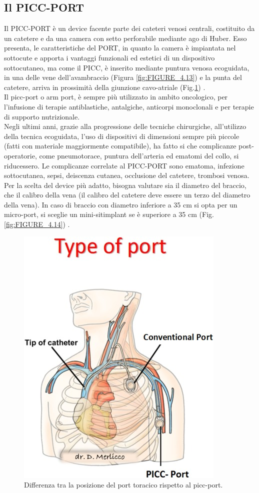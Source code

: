 \subsection{Il PICC-PORT}

Il PICC-PORT è un device facente parte dei cateteri venosi centrali, costituito da un catetere e da una camera con 
setto perforabile mediante ago di Huber. Esso presenta, le caratteristiche del PORT, in quanto la 
camera è impiantata nel sottocute e apporta i vantaggi funzionali ed estetici di un dispositivo sottocutaneo, 
ma come il PICC, è inserito mediante puntura venosa ecoguidata, in una delle vene dell'avambraccio \cite{MERLICCO}
(Figura \ref{fig:FIGURE_4.13})
e la punta del catetere, arriva in prossimità della giunzione cavo-atriale (Fig.\ref{fig:FIGURE_4.12}) \cite{CRO}.\\
Il picc-port o arm port, è sempre più utilizzato in ambito oncologico, per l'infusione di terapie antiblastiche, 
antalgiche, anticorpi monoclonali e per terapie di supporto nutrizionale\cite{GAVECELTPICCPORT}.\\
Negli ultimi anni, grazie alla progressione delle tecniche chirurgiche, all'utilizzo della tecnica ecoguidata, 
l'uso di dispositivi di dimensioni sempre più piccole (fatti con materiale maggiormente compatibile), ha fatto si che 
complicanze post-operatorie, come pneumotorace, puntura dell'arteria ed
ematomi del collo, si riducessero.
Le complicanze correlate al PICC-PORT sono ematoma, infezione sottocutanea, sepsi, deiscenza cutanea, occlusione del 
catetere, trombosi venosa.\\ 
Per la scelta del device più adatto, bisogna valutare sia il diametro del braccio, che il calibro della vena 
(il calibro del catetere deve essere un terzo del diametro della vena). In caso di braccio con diametro inferiore a 
35 cm si opta per un micro-port, si sceglie un mini-sitimplant se è superiore a 35 cm 
(Fig.\ref{fig:FIGURE_4.14}) \cite{GAVECELTPICCPORT}.

\begin{figure}[H]
    \begin{center}
    \includegraphics[width=0.3\columnwidth]{img/picc-port.jpg}
    \vspace{-3mm}
    \end{center}
    \caption{Differenza tra la posizione del port toracico rispetto al picc-port.
    \cite{MERLICCO}}
    \label{fig:FIGURE_4.12}
\end{figure}

